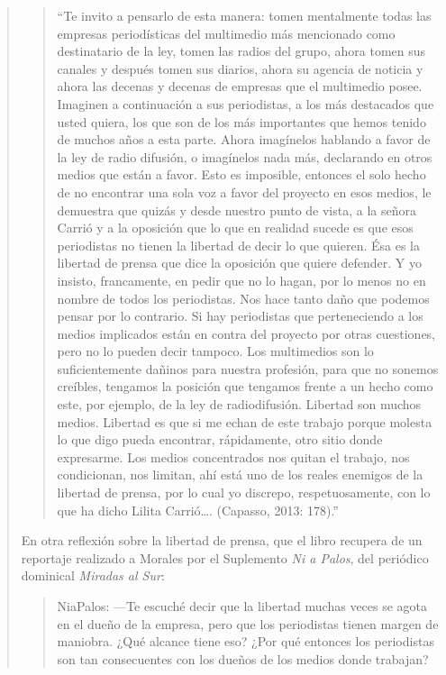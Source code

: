 \begin{quote}
\begin{quote}
	\enquote{Te invito a pensarlo de esta manera: tomen mentalmente todas las empresas periodísticas del multimedio más mencionado como destinatario de la ley, tomen las radios del grupo, ahora tomen sus canales y después tomen sus diarios, ahora su agencia de noticia y ahora las decenas y decenas de empresas que el multimedio posee. Imaginen a continuación a sus periodistas, a los más destacados que usted quiera, los que son de los más importantes que hemos tenido de muchos años a esta parte. Ahora imagínelos hablando a favor de la ley de radio difusión, o imagínelos nada más, declarando en otros medios que están a favor. Esto es imposible, entonces el solo hecho de no encontrar una sola voz a favor del proyecto en esos medios, le demuestra que quizás y desde nuestro punto de vista, a la señora Carrió y a la oposición que lo que en realidad sucede es que esos periodistas no tienen la libertad de decir lo que quieren. Ésa es la libertad de prensa que dice la oposición que quiere defender. Y yo insisto, francamente, en pedir que no lo hagan, por lo menos no en nombre de todos los periodistas. Nos hace tanto daño que podemos pensar por lo contrario. Si hay periodistas que perteneciendo a los medios implicados están en contra del proyecto por otras cuestiones, pero no lo pueden decir tampoco. Los multimedios son lo suficientemente dañinos para nuestra profesión, para que no sonemos creíbles, tengamos la posición que tengamos frente a un hecho como este, por ejemplo, de la ley de radiodifusión. Libertad son muchos medios. Libertad es que si me echan de este trabajo porque molesta lo que digo pueda encontrar, rápidamente, otro sitio donde expresarme. Los medios concentrados nos quitan el trabajo, nos condicionan, nos limitan, ahí está uno de los reales enemigos de la libertad de prensa, por lo cual yo discrepo, respetuosamente, con lo que ha dicho Lilita Carrió\dots. (Capasso, 2013: 178).}
\end{quote}


En otra reflexión sobre la libertad de prensa, que el libro recupera de un reportaje realizado a Morales por el Suplemento \emph{Ni a Palos}, del periódico dominical \emph{Miradas al Sur}:

\begin{quote}
	NiaPalos: ---Te escuché decir que la libertad muchas veces se agota en el dueño de la empresa, pero que los periodistas tienen margen de maniobra. ¿Qué alcance tiene eso? ¿Por qué entonces los periodistas son tan consecuentes con los dueños de los medios donde trabajan?


\end{quote}
\end{quote}
